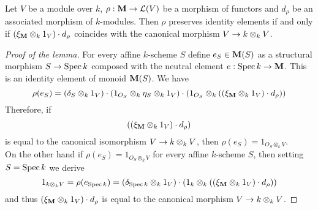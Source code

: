 \begin{lemma}\label{identitypreservation}
Let $V$ be a module over $k$, $\rho:\mathbf{M}\rightarrow {\mathcal L}(V)$ be a morphism of functors and $d_{\rho}$ be an associated morphism of $k$-modules. Then $\rho$ preserves identity elements if and only if 
$\left(\xi_{\mathbf{M}}\otimes_{k}1_V\right)\cdot d_{\rho}$
coincides with the canonical morphism $V\rightarrow k\otimes_{k}V$.
\end{lemma}
\begin{proof}[Proof of the lemma]
For every affine $k$-scheme $S$ define $e_S\in \mathbf{M}(S)$ as a structural morphism $S\rightarrow \mathrm{Spec}\, k$ composed with the neutral element $e:\mathrm{Spec}\, k\rightarrow \mathbf{M}$. This is an identity element of monoid $\mathbf{M}(S)$. We have
$$\rho(e_S)=\left(\delta_S\otimes_{k}1_V\right)\cdot \left(1_{O_S}\otimes_{k}\eta_S\otimes_{k}1_V\right)\cdot \left(1_{O_S}\otimes_{k}\left(\left(\xi_{\mathbf{M}}\otimes_{k}1_V\right)\cdot d_{\rho}\right)\right)$$
Therefore, if 
$$\left(\left(\xi_{\mathbf{M}}\otimes_{k}1_V\right)\cdot d_{\rho}\right)$$
is equal to the canonical isomorphism $V\rightarrow k\otimes_{k}V$, then $\rho(e_S)=1_{O_S\otimes_{k}V}$.\\
On the other hand if $\rho(e_S)=1_{O_S\otimes_{k}V}$ for every affine $k$-scheme $S$, then setting $S=\mathrm{Spec}\, k$ we derive
$$1_{k\otimes_{k}V}=\rho(e_{\mathrm{Spec}\, k})=\left(\delta_{\mathrm{Spec}\, k} \otimes_{k}1_V\right)\cdot \left(1_{k}\otimes_{k}\left(\left(\xi_{\mathbf{M}}\otimes_{k}1_V\right)\cdot d_{\rho}\right)\right)$$ 
and thus $\left(\xi_{\mathbf{M}}\otimes_{k}1_V\right)\cdot d_{\rho}$ is equal to the canonical morphism $V\rightarrow k\otimes_{k}V$.
\end{proof}

